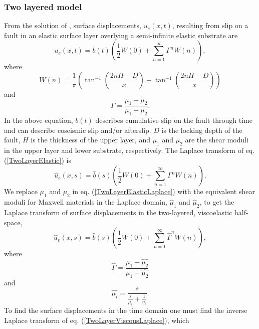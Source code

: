 \documentclass[extra,mreferee]{gji}
\begin{document}
\subsubsection{Two layered model}\label{2D2LModel}
From the solution of \citet{R1971}, surface displacements,
$u_{e}(x,t)$, resulting from slip on a fault in an elastic surface
layer overlying a semi-infinite elastic substrate are
\begin{equation}\label{TwoLayerElastic}
  u_{e}(x,t) = b(t)\left(\frac{1}{2} W(0) + 
    \sum_{n=1}^\infty \Gamma^nW(n)\right),
\end{equation}
where
\begin{equation}
  W(n) = \frac{1}{\pi}\left(\tan^{-1}\left(\frac{2nH + D}{x}\right) 
    - \tan^{-1}\left(\frac{2nH - D}{x}\right)\right)
\end{equation}
and
\begin{equation}
  \Gamma = \frac{\mu_1 - \mu_2}{\mu_1 + \mu_2}.
\end{equation}
In the above equation, $b(t)$ describes cumulative slip on the fault
through time and can describe coseismic slip and/or afterslip. $D$ is
the locking depth of the fault, $H$ is the thickness of the upper
layer, and $\mu_1$ and $\mu_2$ are the shear moduli in the upper
layer and lower substrate, respectively.  The Laplace transform of
eq. (\ref{TwoLayerElastic}) is
\begin{equation}\label{TwoLayerElasticLaplace}
 \hat{u}_e(x,s) = \hat{b}(s)\left(\frac{1}{2} W(0) +\sum_{n=1}^\infty\Gamma^nW(n)\right).
\end{equation}
We replace $\mu_1$ and $\mu_2$ in eq. (\ref{TwoLayerElasticLaplace})
with the equivalent shear moduli for Maxwell materials in the Laplace
domain, $\hat{\mu}_1$ and $\hat{\mu}_2$, to get the Laplace
transform of surface displacements in the two-layered, viscoelastic
half-space,
\begin{equation}\label{TwoLayerViscousLaplace}
 \hat{u}_v(x,s) = \hat{b}(s)\left(\frac{1}{2}W(0) +\sum_{n=1}^\infty\hat{\Gamma}^nW(n)\right),
\end{equation}
where
\begin{equation}
  \hat{\Gamma} = \frac{\hat{\mu_1} - \hat{\mu_2}}{\hat{\mu_1} + \hat{\mu_2}}
\end{equation}
and
\begin{equation}
  \hat{\mu_i} = \frac{s}{\frac{s}{\mu_i} + \frac{1}{\eta_i}}.
\end{equation}
To find the surface displacements in the time domain one must find the
inverse Laplace transform of eq. (\ref{TwoLayerViscousLaplace}), which
\end{document}
